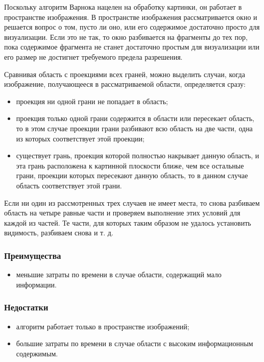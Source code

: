 Поскольку алгоритм Варнока нацелен на обработку картинки, он работает в пространстве изображения. В пространстве изображения рассматривается окно и решается вопрос о том, пусто ли оно, или его содержимое достаточно просто для визуализации. Если это не так, то окно разбивается на фрагменты до тех пор, пока содержимое фрагмента не станет достаточно простым для визуализации или его размер не достигнет требуемого предела разрешения.

Сравнивая область с проекциями всех граней, можно выделить случаи, когда изображение, получающееся в рассматриваемой области, определяется сразу:

\begin{itemize}
	\item	проекция ни одной грани не попадает в область;
	\item	проекция только одной грани содержится в области или пересекает область, то в этом случае проекции грани разбивают всю область на две части, одна из которых соответствует этой проекции;
	\item	существует грань, проекция которой полностью накрывает данную область, и эта грань расположена к картинной плоскости ближе, чем все остальные грани, проекции которых пересекают данную область, то в данном случае область соответствует этой грани.
\end{itemize}

Если ни один из рассмотренных трех случаев не имеет места, то снова разбиваем область на четыре равные части и проверяем выполнение этих условий для каждой из частей. Те части, для которых таким образом не удалось установить видимость, разбиваем снова и т. д.

\subsubsection*{Преимущества}
\begin{itemize}
	\item	меньшие затраты по времени в случае области, содержащий мало информации.
\end{itemize}


\subsubsection*{Недостатки}
\begin{itemize}
	\item	алгоритм работает только в пространстве изображений;
	\item	большие затраты по времени в случае области с высоким информационным содержимым.
\end{itemize}

